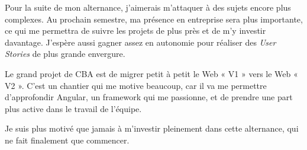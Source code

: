 \documentclass{article}
\begin{document}
Pour la suite de mon alternance, j'aimerais m'attaquer à des sujets encore plus complexes. Au prochain semestre, ma présence en entreprise sera plus importante, ce qui me permettra de suivre les projets de plus près et de m'y investir davantage. J'espère aussi gagner assez en autonomie pour réaliser des \textit{User Stories} de plus grande envergure.

Le grand projet de CBA est de migrer petit à petit le Web « V1 » vers le Web « V2 ». C'est un chantier qui me motive beaucoup, car il va me permettre d'approfondir Angular, un framework qui me passionne, et de prendre une part plus active dans le travail de l'équipe.

Je suis plus motivé que jamais à m'investir pleinement dans cette alternance, qui ne fait finalement que commencer.

\end{document}
